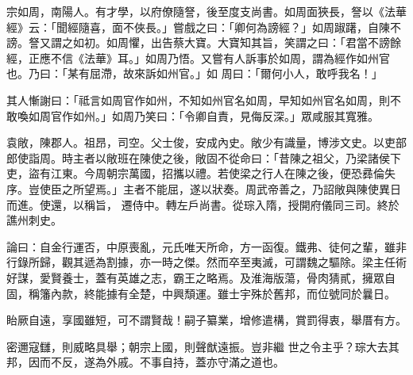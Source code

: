 \begin{pinyinscope}
 宗如周，南陽人。有才學，以府僚隨詧，後至度支尚書。如周面狹長，詧以《法華經》云：「聞經隨喜，面不俠長。」嘗戲之曰：「卿何為謗經？」如周踧躇，自陳不謗。詧又謂之如初。如周懼，出告蔡大寶。大寶知其旨，笑謂之曰：「君當不謗餘經，正應不信《法華》耳。」如周乃悟。又嘗有人訴事於如周，謂為經作如州官也。乃曰：「某有屈滯，故來訴如州官。」如
 周曰：「爾何小人，敢呼我名！」



 其人慚謝曰：「祗言如周官作如州，不知如州官名如周，早知如州官名如周，則不敢喚如周官作如州。」如周乃笑曰：「令卿自責，見侮反深。」眾咸服其寬雅。



 袁敞，陳郡人。祖昂，司空。父士俊，安成內史。敞少有識量，博涉文史。以吏部郎使詣周。時主者以敞班在陳使之後，敞固不從命曰：「昔陳之祖父，乃梁諸侯下吏，盜有江東。今周朝宗萬國，招攜以禮。若使梁之行人在陳之後，便恐彞倫失序。豈使臣之所望焉。」主者不能屈，遂以狀奏。周武帝善之，乃詔敞與陳使異日而進。使還，以稱旨，
 遷侍中。轉左戶尚書。從琮入隋，授開府儀同三司。終於譙州刺史。



 論曰：自金行運否，中原喪亂，元氏唯天所命，方一函復。鐵弗、徒何之輩，雖非行錄所歸，觀其遞為割據，亦一時之傑。然而卒至夷滅，可謂魏之驅除。梁主任術好謀，愛賢養士，蓋有英雄之志，霸王之略焉。及淮海版蕩，骨肉猜貳，擁眾自固，稱籓內款，終能據有全楚，中興頹運。雖士宇殊於舊邦，而位號同於曩日。



 眙厥自遠，享國雖短，可不謂賢哉！嗣子纂業，增修遣構，賞罰得衷，舉厝有方。



 密邇寇讎，則威略具舉；朝宗上國，則聲猷遠振。豈非繼
 世之令主乎？琮大去其邦，因而不反，遂為外戚。不事自持，蓋亦守滿之道也。



\end{pinyinscope}